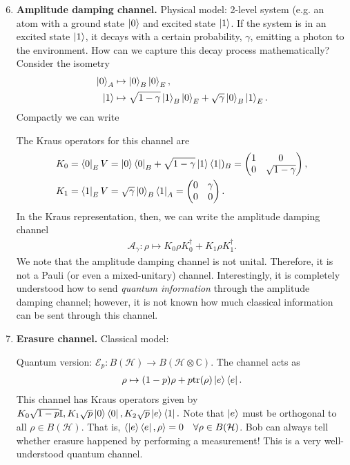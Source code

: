 \documentclass[10pt,oneside,longbibliography]{report}
\begin{document}
\begin{enumerate}
\setcounter{enumi}{5}
    \item \textbf{Amplitude damping channel.} Physical model: 2-level system (e.g. an atom with a ground state $\ket{0}$ and excited state $\ket{1}$. If the system is in an excited state $\ket{1}$, it decays with a certain probability, $\gamma$, emitting a photon to the environment. How can we capture this decay process mathematically? Consider the isometry 
    \begin{align}
        \ket{0}_A &\mapsto \ket{0}_B \ket{0}_E,\\
        \ket{1} &\mapsto \sqrt{1-\gamma} \ket{1}_B \ket{0}_E +\sqrt{\gamma}\ket{0}_B\ket{1}_E.
    \end{align}
Compactly we can write

The Kraus operators for this channel are 
\begin{align}
    K_0 &=\bra{0}_E V = \ket{0}\bra{0}_B + \sqrt{1-\gamma} \ket{1}\bra{1})_B = \begin{pmatrix}
    1 & 0 \\
    0 & \sqrt{1-\gamma}
    \end{pmatrix},\\
     K_1&= \bra{1}_E V = \sqrt{\gamma}\ket{0}_B\bra{1}_A = \begin{pmatrix}
    0 & \gamma \\
    0 & 0
    \end{pmatrix}.
\end{align}
In the Kraus representation, then, we can write the amplitude damping channel 
\begin{align}
    \mathcal{A}_{\gamma}: \rho \mapsto K_0 \rho K_0^{\dagger} + K_1 \rho K_1^{\dagger}.
\end{align}
We note that the amplitude damping channel is not unital. Therefore, it is not a Pauli (or even a mixed-unitary) channel. Interestingly, it is completely understood how to send \textit{quantum information} through the amplitude damping channel; however, it is not known how much classical information can be sent through this channel.
\item \textbf{Erasure channel.} Classical model:

Quantum version: $\mathcal{E}_p: B(\mathcal{H}) \rightarrow B(\mathcal{H} \otimes \mathbb{C})$. The channel acts as
\begin{align}
    \rho \mapsto (1-p) \rho + p \text{tr}(\rho) \ket{e}\bra{e}.
\end{align}
This channel has Kraus operators given by $K_0 \sqrt{1-p} \mathbb{I}, K_1 \sqrt{p}\ket{0}\bra{0}, K_2 \sqrt{p} \ket{e}\bra{1}.$ Note that $\ket{e}$ must be orthogonal to all $\rho \in B(\mathcal{H})$. That is, $\braket{\ket{e}\bra{e},\rho}=0 \quad \forall \rho \in B(\mathcal{H})$. Bob can always tell whether erasure happened by performing a measurement! This is a very well-understood quantum channel.
\end{enumerate}
\end{document}
